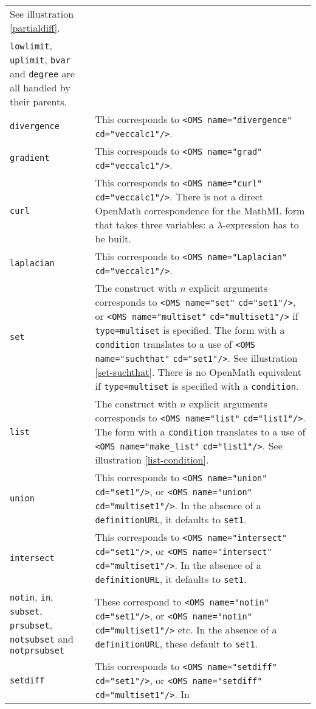 \documentclass[twoside,11pt]{article}
\begin{document}
\begin{longtable}{
        >{\raggedright\let\\=\tabularnewline}p{2in}
        >{\raggedright\let\\=\tabularnewline}p{3in}}
See illustration \ref{partialdiff}.\\
\verb+lowlimit+, \verb+uplimit+, \verb+bvar+ and \verb+degree+ are all
handled by their parents.\\
\verb+divergence+&This corresponds to 
\verb+<OMS name="divergence"+ \verb+cd="veccalc1"/>+.\\
\verb+gradient+&This corresponds to 
\verb+<OMS name="grad"+ \verb+cd="veccalc1"/>+.\\
\verb+curl+&This corresponds to 
\verb+<OMS name="curl"+ \verb+cd="veccalc1"/>+. There is not a direct
OpenMath correspondence for the MathML form that takes three variables: a
$\lambda$-expression has to be built.\\
\verb+laplacian+&This corresponds to 
\verb+<OMS name="Laplacian"+ \verb+cd="veccalc1"/>+.\\
\verb+set+&The construct with $n$ explicit arguments corresponds to
\verb+<OMS name="set"+ \verb+cd="set1"/>+, or
\verb+<OMS name="multiset"+ \verb+cd="multiset1"/>+ if \verb+type=multiset+
is specified. The form with a \verb+condition+
translates to a use of \verb+<OMS name="suchthat"+ \verb+cd="set1"/>+. See
illustration \ref{set-suchthat}. There is no OpenMath equivalent if
\verb+type=multiset+ is specified with a \verb+condition+.\\
\verb+list+&The construct with $n$ explicit arguments corresponds to
\verb+<OMS name="list"+ \verb+cd="list1"/>+. The form with a \verb+condition+
translates to a use of \verb+<OMS name="make_list"+ \verb+cd="list1"/>+. See
illustration \ref{list-condition}.\\
\verb+union+&This corresponds to \verb+<OMS name="union"+ \verb+cd="set1"/>+, or
\verb+<OMS name="union"+ \verb+cd="multiset1"/>+. In the absence of a
\verb+definitionURL+, it defaults to \verb+set1+.\\
\verb+intersect+&This corresponds to
\verb+<OMS name="intersect"+ \verb+cd="set1"/>+, or
\verb+<OMS name="intersect"+ \verb+cd="multiset1"/>+. In the absence of a
\verb+definitionURL+, it defaults to \verb+set1+.\\
\verb+notin+, \verb+in+, \verb+subset+, \verb+prsubset+,
\verb+notsubset+ and \verb+notprsubset+&These correspond to
\verb+<OMS name="notin"+ \verb+cd="set1"/>+, or 
\verb+<OMS name="notin"+ \verb+cd="multiset1"/>+ etc. In the absence of a
\verb+definitionURL+, these default to \verb+set1+.\\
\verb+setdiff+&This corresponds to \verb+<OMS name="setdiff"+ 
\verb+cd="set1"/>+, or \verb+<OMS name="setdiff"+ \verb+cd="multiset1"/>+. In 

\end{longtable}
\end{document}
